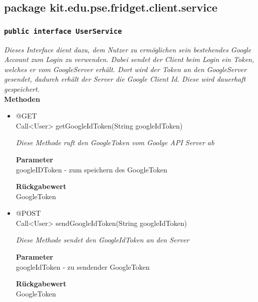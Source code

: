\documentclass[a4paper]{scrreprt}
\begin{document}
        \newpage
                
                
		\subsection{package kit.edu.pse.fridget.client.service}
		\subsubsection{\texttt{public interface UserService}}
        \textit{Dieses Interface dient dazu, dem Nutzer zu ermöglichen sein bestehendes Google Account zum Login zu verwenden. Dabei sendet der Client beim Login ein Token, welches er vom GoogleServer erhält. Dort wird der Token an den GoogleServer gesendet, dadurch erhält der Server die Google Client Id. Diese wird dauerhaft gespeichert.}\\
        
		\textbf{Methoden} \\
 			\begin{itemize}
        		\item{@GET\\ Call<User> getGoogleIdToken(String googleIdToken)}
        	
        		\textit{Diese Methode ruft den GoogleToken vom Goolge API Server ab}
        	
        		\textbf{Parameter} \\
                googleIDToken - zum speichern des GoogleToken
        		        	
       		 	\textbf{Rückgabewert} \\
                GoogleToken
      		  	 
      	      \item{@POST\\ Call<User> sendGoogleIdToken(String googleIdToken)}
        	
      	 	 	\textit{Diese Methode sendet den GoogleIdToken an den Server}
        	
        		\textbf{Parameter} \\
        		googleIdToken - zu sendender GoogleToken
        	
        		\textbf{Rückgabewert} \\
                GoogleToken
        	
       		 \end{itemize}
             
\end{document}
